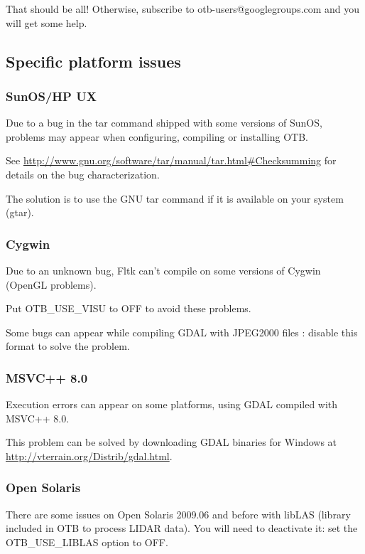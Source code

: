 That should be all! Otherwise, subscribe to
   otb-users@googlegroups.com and you will get some help.

\subsection{Specific platform issues}
\subsubsection{SunOS/HP UX}
Due to a bug in the tar command shipped with some versions of SunOS,
problems may appear when configuring, compiling or installing OTB.

See \url{http://www.gnu.org/software/tar/manual/tar.html#Checksumming} for
details on the bug characterization.

The solution is to use the GNU tar command if it is available on your
system (gtar).


\subsubsection{Cygwin}
Due to an unknown bug, Fltk can't compile on some versions of Cygwin (OpenGL problems).

Put OTB\_USE\_VISU to OFF to avoid these problems.

Some bugs can appear while compiling GDAL with JPEG2000 files : disable this format to solve the problem.

\subsubsection{MSVC++ 8.0}
Execution errors can appear on some platforms, using GDAL compiled with MSVC++ 8.0.

This problem can be solved by downloading GDAL binaries for Windows
at \url{http://vterrain.org/Distrib/gdal.html}.

\subsubsection{Open Solaris}
There are some issues on Open Solaris 2009.06 and before with libLAS (library included
in OTB to process LIDAR data). You will need to deactivate it: set the
OTB\_USE\_LIBLAS option to OFF.

